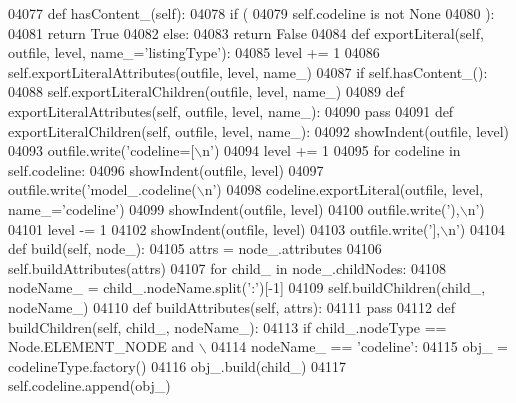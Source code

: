 \begin{DoxyCode}
{{{{{{{{{{{{{{{{{{{{{{{{{{{{{{{{{{{{{{{{{{{{{{{{{{{{{{{{{{{{{{{{{{{{{{{{{{{{{{{{{{{{{{{{{{{{{{{{{{{{{{{{{{{{{{{{{{{{{{{{{{{{{{{{{{{{{{{{{{{{{{{{{{{{{{{{{{{{{{{{{{{{{{{{{{{{{{{{{{{{{{{{{{{{{{{{{{{{{{{{{{{{{{{{{{{{{{{{{{{{{{{{{{{{{{{{{{{{{{{{{{{{{{{{{{{{{{{{{{{{{{{{{{{04077     \textcolor{keyword}{def }hasContent_(self):
04078         \textcolor{keywordflow}{if} (
04079             self.codeline \textcolor{keywordflow}{is} \textcolor{keywordflow}{not} \textcolor{keywordtype}{None}
04080             ):
04081             \textcolor{keywordflow}{return} \textcolor{keyword}{True}
04082         \textcolor{keywordflow}{else}:
04083             \textcolor{keywordflow}{return} \textcolor{keyword}{False}
04084     \textcolor{keyword}{def }exportLiteral(self, outfile, level, name\_='listingType'):
04085         level += 1
04086         self.exportLiteralAttributes(outfile, level, name\_)
04087         \textcolor{keywordflow}{if} self.hasContent_():
04088             self.exportLiteralChildren(outfile, level, name\_)
04089     \textcolor{keyword}{def }exportLiteralAttributes(self, outfile, level, name\_):
04090         \textcolor{keywordflow}{pass}
04091     \textcolor{keyword}{def }exportLiteralChildren(self, outfile, level, name\_):
04092         showIndent(outfile, level)
04093         outfile.write(\textcolor{stringliteral}{'codeline=[\(\backslash\)n'})
04094         level += 1
04095         \textcolor{keywordflow}{for} codeline \textcolor{keywordflow}{in} self.codeline:
04096             showIndent(outfile, level)
04097             outfile.write(\textcolor{stringliteral}{'model\_.codeline(\(\backslash\)n'})
04098             codeline.exportLiteral(outfile, level, name\_=\textcolor{stringliteral}{'codeline'})
04099             showIndent(outfile, level)
04100             outfile.write(\textcolor{stringliteral}{'),\(\backslash\)n'})
04101         level -= 1
04102         showIndent(outfile, level)
04103         outfile.write(\textcolor{stringliteral}{'],\(\backslash\)n'})
04104     \textcolor{keyword}{def }build(self, node\_):
04105         attrs = node\_.attributes
04106         self.buildAttributes(attrs)
04107         \textcolor{keywordflow}{for} child\_ \textcolor{keywordflow}{in} node\_.childNodes:
04108             nodeName\_ = child\_.nodeName.split(\textcolor{stringliteral}{':'})[-1]
04109             self.buildChildren(child\_, nodeName\_)
04110     \textcolor{keyword}{def }buildAttributes(self, attrs):
04111         \textcolor{keywordflow}{pass}
04112     \textcolor{keyword}{def }buildChildren(self, child\_, nodeName\_):
04113         \textcolor{keywordflow}{if} child\_.nodeType == Node.ELEMENT\_NODE \textcolor{keywordflow}{and} \(\backslash\)
04114             nodeName\_ == \textcolor{stringliteral}{'codeline'}:
04115             obj\_ = codelineType.factory()
04116             obj\_.build(child\_)
04117             self.codeline.append(obj\_)
}}}}}}}}}}}}}}}}}}}}}}}}}}}}}}}}}}}}}}}}}}}}}}}}}}}}}}}}}}}}}}}}}}}}}}}}}}}}}}}}}}}}}}}}}}}}}}}}}}}}}}}}}}}}}}}}}}}}}}}}}}}}}}}}}}}}}}}}}}}}}}}}}}}}}}}}}}}}}}}}}}}}}}}}}}}}}}}}}}}}}}}}}}}}}}}}}}}}}}}}}}}}}}}}}}}}}}}}}}}}}}}}}}}}}}}}}}}}}}}}}}}}}}}}}}}}}}}}}}}}}}}}}}}
\end{DoxyCode}
